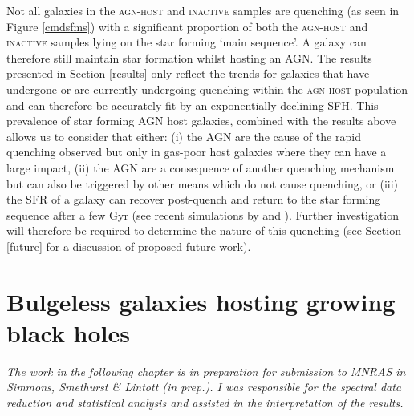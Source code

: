 Not all galaxies in the \textsc{agn-host} and \textsc{inactive} samples are quenching (as seen in Figure \ref{cmdsfms}) with a significant proportion of both the \textsc{agn-host} and \textsc{inactive} samples lying on the star forming `main sequence'. A galaxy can therefore still maintain star formation whilst hosting an AGN. The results presented in Section \ref{results} only reflect the trends for galaxies that have undergone or are currently undergoing quenching within the \textsc{agn-host} population and can therefore be accurately fit by an exponentially declining SFH. This prevalence of star forming AGN host galaxies, combined with the results above allows us to consider that either: (i)  the AGN are the cause of the rapid quenching observed but only in gas-poor host galaxies where they can have a large impact, (ii) the AGN are a consequence of another quenching mechanism but can also be triggered by other means which do not cause quenching, or (iii) the SFR of a galaxy can recover post-quench and return to the star forming sequence after a few Gyr (see recent simulations by \citealt{pontzen16} and \citealt{sparre16}). Further investigation will therefore be required to determine the nature of this quenching (see Section \ref{future} for a discussion of proposed future work).


 

\newpage

\section{Bulgeless galaxies hosting growing black holes}\label{intbulgeless}

\emph{The work in the following chapter is in preparation for submission to MNRAS in Simmons, Smethurst \& Lintott (in prep.). I was responsible for the spectral data reduction and statistical analysis and assisted in the interpretation of the results.}

